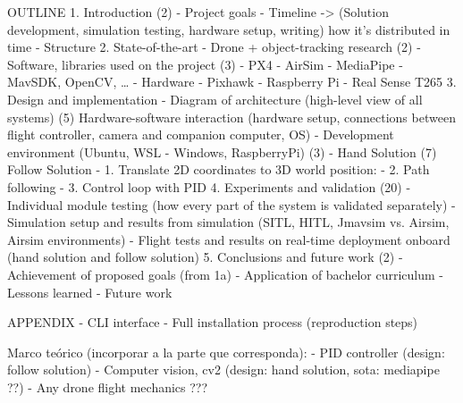 OUTLINE
1. Introduction (2)
 	- Project goals
	- Timeline -> (Solution development, simulation testing, hardware setup, writing) how it's distributed in time
	- Structure
2. State-of-the-art
	- Drone + object-tracking research (2)
	- Software, libraries used on the project (3)
		- PX4
		- AirSim
		- MediaPipe
		- MavSDK, OpenCV, …
	- Hardware
	    - Pixhawk
	    - Raspberry Pi
	    - Real Sense T265
3. Design and implementation
	- Diagram of architecture (high-level view of all systems) (5)
      Hardware-software interaction (hardware setup, connections between flight controller, camera and companion computer, OS)
	- Development environment (Ubuntu, WSL - Windows, RaspberryPi) (3)
	- Hand Solution (7)
      Follow Solution
	     - 1. Translate 2D coordinates to 3D world position:
	     - 2. Path following
	     - 3. Control loop with PID
4. Experiments and validation (20)
	- Individual module testing (how every part of the system is validated separately)
	- Simulation setup and results from simulation (SITL, HITL, Jmavsim vs. Airsim, Airsim environments)
	- Flight tests and results on real-time deployment onboard (hand solution and follow solution)
5. Conclusions and future work (2)
	- Achievement of proposed goals (from 1a)
	- Application of bachelor curriculum
	- Lessons learned
	- Future work

APPENDIX
	- CLI interface
	- Full installation process (reproduction steps)
	
Marco teórico (incorporar a la parte que corresponda):
 - PID controller (design: follow solution)
 - Computer vision, cv2 (design: hand solution, sota: mediapipe ??)
 - Any drone flight mechanics ???